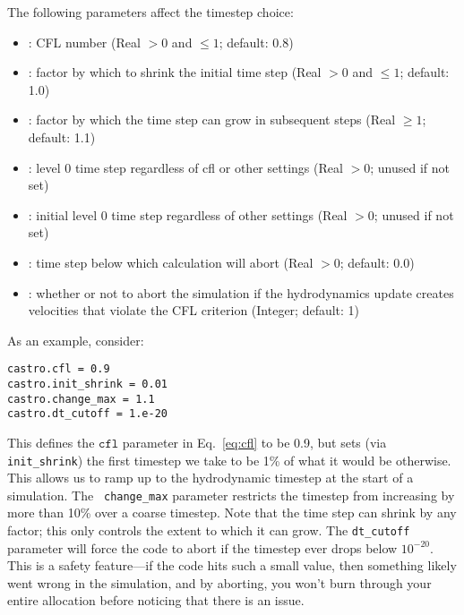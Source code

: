 The following parameters affect the timestep choice:
\begin{itemize}
\item {}: CFL number (Real $> 0$ and $\leq 1$;
  default: 0.8)

\item {}: factor by which to shrink the initial
   time step (Real $> 0$ and $\leq 1$; default: 1.0)

\item {}: factor by which the time step can
  grow in subsequent steps (Real $\geq 1$; default: 1.1)

\item {}: level 0 time step regardless of cfl
  or other settings (Real $> 0$; unused if not set)

\item {}: initial level 0 time
   step regardless of other settings (Real $> 0$;  unused if not set)

\item {}: time step below which calculation
  will abort (Real $> 0$; default: 0.0)

\item {}: whether or not to abort the
  simulation if the hydrodynamics update creates velocities that
  violate the CFL criterion (Integer; default: 1)
\end{itemize}

As an example, consider:
\begin{lstlisting}
castro.cfl = 0.9 
castro.init_shrink = 0.01 
castro.change_max = 1.1
castro.dt_cutoff = 1.e-20
\end{lstlisting}
This defines the $\mathtt{cfl}$ parameter in Eq.~\ref{eq:cfl} to be
0.9, but sets (via {\tt init\_shrink}) the first timestep we take to
be 1\% of what it would be otherwise.  This allows us to ramp up to
the hydrodynamic timestep at the start of a simulation.  The {\tt
  change\_max} parameter restricts the timestep from increasing by
more than 10\% over a coarse timestep.  Note that the time step can
shrink by any factor; this only controls the extent to which it can
grow.  The {\tt dt\_cutoff} parameter will force the code to abort if
the timestep ever drops below $10^{-20}$.  This is a safety
feature---if the code hits such a small value, then something likely
went wrong in the simulation, and by aborting, you won't burn through
your entire allocation before noticing that there is an issue.

